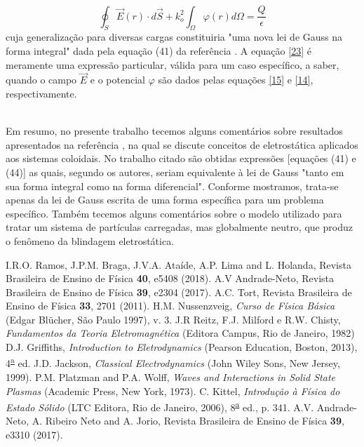 \documentclass[brazilian,10.7pt,a4paper]{article}
\begin{document}
\\
\begin{equation}\label{23}
\oint_{S}{\vec{E}(r)\cdot d\vec{S}+k^{2}_{o}}\int_{\Omega}{\varphi(r)d\Omega}=\frac{Q}{\epsilon}
\end{equation}
cuja generalização para diversas cargas constituiria "uma nova lei de Gauss na forma integral" dada pela equação (41) da referência \cite{ramos}. A equação \eqref{23} é meramente uma expressão particular, válida para um caso específico, a saber, quando o campo $\vec{E}$ e o potencial $\varphi$ são dados pelas equações \eqref{15} e \eqref{14}, respectivamente.\\%
\\
\par Em resumo, no presente trabalho tecemos alguns comentários sobre resultados apresentados na referência \cite{ramos}, na qual se discute conceitos de eletrostática aplicados aos sistemas coloidais. No trabalho citado são obtidas expressões [equações (41) e (44)] as quais, segundo os autores, seriam equivalente à lei de Gauss "tanto em sua forma integral como na forma diferencial". Conforme mostramos, trata-se apenas da lei de Gauss escrita de uma forma específica para um problema específico. Também tecemos alguns comentários sobre o modelo utilizado para tratar um sistema de partículas carregadas, mas globalmente neutro, que produz o fenômeno da blindagem eletrostática.
\\
\begin{thebibliography}{10}
\small{
I.R.O. Ramos, J.P.M. Braga, J.V.A. Ataíde, A.P. Lima and L. Holanda, Revista Brasileira de Ensino de Física \textbf{40}, e5408 (2018).
A.V Andrade-Neto, Revista Brasileira de Ensino de Física \textbf{39}, e2304 (2017).
A.C. Tort, Revista Brasileira de Ensino de Física \textbf{33}, 2701 (2011).
H.M. Nussenzveig, \textit{Curso de Física Básica} (Edgar Blücher, São Paulo 1997), v. 3.
J.R Reitz, F.J. Milford e R.W. Chisty, \textit{Fundamentos da Teoria Eletromagnética} (Editora Campus, Rio de Janeiro, 1982)
D.J. Griffiths, \textit{Introduction to Eletrodynamics} (Pearson Education, Boston, 2013), 4\textsuperscript{\underline{a}} ed.
J.D. Jackson, \textit{Classical Electrodynamics} (John Wiley Sons, New Jersey, 1999).
P.M. Platzman and P.A. Wolff, \textit{Waves and Interactions in Solid State Plasmas} (Academic Press, New York, 1973).
C. Kittel, \textit{Introdução à Física do Estado Sólido} (LTC Editora, Rio de Janeiro, 2006), 8\textsuperscript{\underline{a}} ed., p. 341.
A.V. Andrade-Neto, A. Ribeiro Neto and A. Jorio, Revista Brasileira de Ensino de Física \textbf{39}, e3310 (2017).
}
\end{thebibliography}
\end{document}
